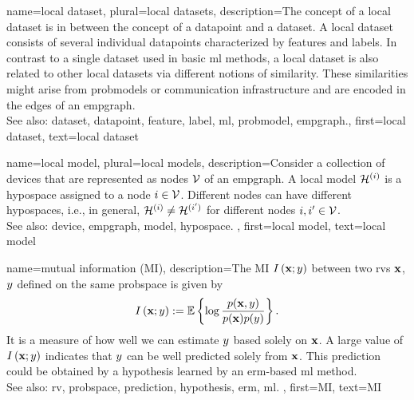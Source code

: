 	
{name={local dataset}, plural={local datasets}, 
	description={The concept of a local \gls{dataset} is 
		in between the concept of a \gls{datapoint} and a \gls{dataset}. A local \gls{dataset} consists of several 
		individual \glspl{datapoint} characterized by \glspl{feature} and \glspl{label}. 
		In contrast to a single \gls{dataset} used in basic \gls{ml} methods, a local \gls{dataset} is also 
		related to other local \glspl{dataset} via different notions of similarity. These similarities 
		might arise from \glspl{probmodel} or communication infrastructure and 
		are encoded in the edges of an \gls{empgraph}.
				\\
		See also: \gls{dataset}, \gls{datapoint}, \gls{feature}, \gls{label}, \gls{ml}, \gls{probmodel}, \gls{empgraph}.},
		first={local dataset},
		text={local dataset}
}
	
{name={local model}, plural={local models}, 
	description={Consider a collection of \glspl{device} that are represented 
		as nodes $\mathcal{V}$ of an \gls{empgraph}. A local \gls{model} $\mathcal{H}^{(i)}$ 
		is a \gls{hypospace} assigned to a node $i \in \mathcal{V}$. Different nodes can have 
		different \glspl{hypospace}, i.e., in general, $\mathcal{H}^{(i)} \neq \mathcal{H}^{(i')}$ 
		for different nodes $i, i' \in \mathcal{V}$. 
				\\
		See also: \gls{device}, \gls{empgraph}, \gls{model}, \gls{hypospace}. },
	first={local model},
	text={local model}
}
	
{name={mutual information (MI)},
 	description={The MI $I \left( {\bf x};y\right)$ 
 		between two \glspl{rv} ${\bf x}$, $y$ defined on the same \gls{probspace} 
 		is given by \cite{coverthomas} $$I \left( {\bf x};y\right) := 
		\mathbb{E} \left\{ \log \frac{p ({\bf x},y)}{p({\bf x})p(y)} \right\}.$$ 
		It is a measure of how well we can estimate $y$ based 
		solely on ${\bf x}$. A large value of $I \left( {\bf x};y\right)$ indicates that 
		$y$ can be well predicted solely from ${\bf x}$. This \gls{prediction} could be obtained by a 
		\gls{hypothesis} learned by an \gls{erm}-based \gls{ml} method. 
				\\
		See also: \gls{rv}, \gls{probspace}, \gls{prediction}, \gls{hypothesis}, \gls{erm}, \gls{ml}. }, 
	first={MI}, 
	text={MI} 
}

